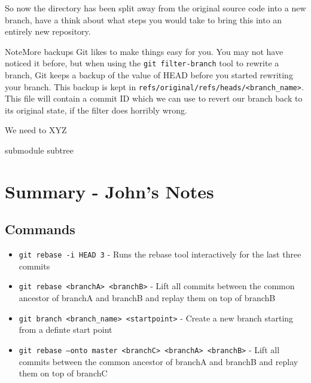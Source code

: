 
So now the directory has been split away from the original source code into a new branch, have a think about what steps you would take to bring this into an entirely new repository.

\begin{callout}{Note}{More backups}
Git likes to make things easy for you.
You may not have noticed it before, but when using the \texttt{git filter-branch} tool to rewrite a branch, Git keeps a backup of the value of HEAD before you started rewriting your branch.
This backup is kept in \texttt{refs/original/refs/heads/<branch\_name>}.
This file will contain a commit ID which we can use to revert our branch back to its original state, if the filter does horribly wrong.
\end{callout}

We need to XYZ

submodule
subtree

\clearpage

\section{Summary - John's Notes}
\subsection{Commands}
\begin{itemize}

\item\texttt{git rebase -i HEAD~3} - Runs the rebase tool interactively for the last three commits

\item\texttt{git rebase <branchA> <branchB>} - Lift all commits between the common ancestor of branchA and branchB and replay them on top of branchB

\item\texttt{git branch <branch\_name> <startpoint>} - Create a new branch starting from a definte start point

\item\texttt{git rebase --onto master <branchC> \newline <branchA> <branchB>} - Lift all commits between the common ancestor of branchA and branchB and replay them on top of branchC
\end{itemize}

